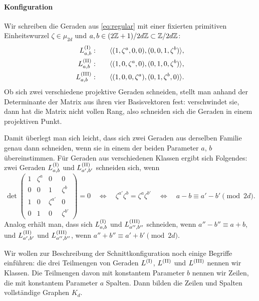\paragraph{Konfiguration} Wir schreiben die Geraden aus \eqref{eq:regular} mit einer fixierten primitiven Einheitswurzel $\zeta \in \mu_{2d}$ und $a,b \in (2\mathbb Z + 1)/2d\mathbb Z \subset \Zmod 2dZ$:
\begin{equation}
\begin{split}
\Lcl(I)_{a,b}  :\qquad	&\langle (1,\zeta^a,0,0), (0,0,1,\zeta^b)\rangle, \\
\Lcl(II)_{a,b} :\qquad	&\langle (1,0,\zeta^a,0), (0,1,0,\zeta^b)\rangle, \\
\Lcl(III)_{a,b}:\qquad	&\langle (1,0,0,\zeta^a), (0,1,\zeta^b,0)\rangle.
\end{split}
\end{equation}
Ob sich zwei verschiedene projektive Geraden schneiden, stellt man anhand der Determinante der Matrix aus ihren vier Basisvektoren fest: verschwindet sie, dann hat die Matrix nicht vollen Rang, also schneiden sich die Geraden in einem projektiven Punkt.

Damit überlegt man sich leicht, dass sich zwei Geraden aus derselben Familie genau dann schneiden, wenn sie in einem der beiden Parameter $a$, $b$ übereinstimmen. Für Geraden aus verschiedenen Klassen ergibt sich Folgendes: zwei Geraden $\Lcl(I)_{a,b}$ und $\Lcl(II)_{a',b'}$ schneiden sich, wenn
\begin{equation}
\det \begin{pmatrix}
1 & \zeta^a & 0 & 0 \\
0 & 0 & 1 & \zeta^b \\
1 & 0 & \zeta^{a'} & 0 \\
0 & 1 & 0 & \zeta^{b'}
\end{pmatrix} = 0 \quad\Longleftrightarrow\quad \zeta^{a'} \zeta^b = \zeta^a \zeta^{b'} \quad\Leftrightarrow\quad a-b \equiv a'-b' \pmod{2d}.
\end{equation}
Analog erhält man, dass sich $\Lcl(I)_{a,b}$ und $\Lcl(III)_{a'',b''}$ schneiden, wenn $a''-b'' \equiv a+b$, und $\Lcl(II)_{a',b'}$ und $\Lcl(III)_{a'',b''}$, wenn $a''+b'' \equiv a'+b' \pmod{2d}$.

Wir wollen zur Beschreibung der Schnittkonfiguration noch einige Begriffe einführen: die drei Teilmengen von Geraden $\Lcl(I)$, $\Lcl(II)$ und $\Lcl(III)$ nennen wir Klassen. Die Teilmengen davon mit konstantem Parameter $b$ nennen wir Zeilen, die mit konstantem Parameter $a$ Spalten. Dann bilden die Zeilen und Spalten vollständige Graphen $K_d$.

